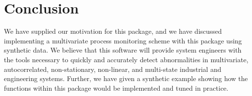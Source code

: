 \documentclass{report}\usepackage[]{graphicx}\usepackage[]{color}
\begin{document}
\section{Conclusion} \label{sec:D_Conclusion}
We have supplied our motivation for this package, and we have discussed implementing a multivariate process monitoring scheme with this package using synthetic data. We believe that this software will provide system engineers with the tools necessary to quickly and accurately detect abnormalities in multivariate, autocorrelated, non-stationary, non-linear, and multi-state industrial and engineering systems. Further, we have given a synthetic example showing how the functions within this package would be implemented and tuned in practice.
\end{document}
